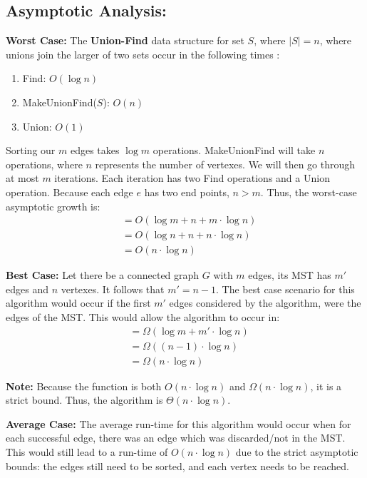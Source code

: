 \documentclass{article}
\begin{document}
\subsection*{Asymptotic Analysis:}
\noindent \textbf{Worst Case:}
The \textbf{Union-Find} data structure for set $S$, where $\mid S \mid = n$, where unions join the larger of two sets occur in the following times \citep{algDesign}:
\begin{enumerate}
	\item Find:  $O(\log{n})$
	\item MakeUnionFind($S$):  $O(n)$
	\item Union:  $O(1)$
\end{enumerate}

Sorting our $m$ edges takes $\log{m}$ operations.  MakeUnionFind will take $n$ operations, where $n$ represents the number of vertexes.  We will then go through at most $m$ iterations.  Each iteration has two Find operations and a Union operation.  Because each edge $e$ has two end points, $n > m$.  Thus, the worst-case asymptotic growth is:
\begin{align*}
&= O(\log{m} + n + m \cdot \log{n} ) \\
&= O(\log{n} + n + n \cdot \log{n} ) \\
&= O(n \cdot \log{n} )
\end{align*}

\noindent \textbf{Best Case:}
Let there be a connected graph $G$ with $m$ edges, its MST has $m'$ edges and $n$ vertexes.  It follows that $m' = n-1$.  The best case scenario for this algorithm would occur if the first $m'$ edges considered by the algorithm, were the edges of the MST.
This would allow the algorithm to occur in:
\begin{align*}
&= \Omega( \log{m} + m' \cdot \log{n} ) \\
&= \Omega( (n - 1) \cdot \log{n} ) \\
&= \Omega( n \cdot \log{n} ) 
\end{align*}

\noindent \textbf{Note:}  Because the function is both $O(n \cdot \log{n} )$ and $\Omega (n \cdot \log{n} )$, it is a strict bound.  Thus, the algorithm is $\Theta (n \cdot \log{n})$. \newline

\noindent \textbf{Average Case:}
The average run-time for this algorithm would occur when for each successful edge, there was an edge which was discarded/not in the MST.  This would still lead to a run-time of $O(n \cdot \log{n})$ due to the strict asymptotic bounds:  the edges still need to be sorted, and each vertex needs to be reached.
\end{document}
